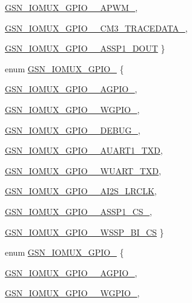 \begin{DoxyCompactItemize}
\par
\hyperlink{a00519_a2482cd55eb57e3f76b1ce4ac8b2c95c6ae1f534d3ea31f6bc476fa5f2a869f445}{GSN\_\-IOMUX\_\-GPIO\_\_\-APWM\_}, 
\par
\hyperlink{a00519_a2482cd55eb57e3f76b1ce4ac8b2c95c6a4d73c895de9cc795bd97d64a08ec021b}{GSN\_\-IOMUX\_\-GPIO\_\_\-CM3\_\-TRACEDATA\_}, 
\par
\hyperlink{a00519_a2482cd55eb57e3f76b1ce4ac8b2c95c6af34510a558c0e12fbd7bab49eeb75d74}{GSN\_\-IOMUX\_\-GPIO\_\_\-ASSP1\_\-DOUT}
 \}
\item 
enum \hyperlink{a00519_a4c309e7a91ab48d86106485591b85ba7}{GSN\_\-IOMUX\_\-GPIO\_} \{ \par
\hyperlink{a00519_a4c309e7a91ab48d86106485591b85ba7a68ab6b0225f599371050cb168b0a8a03}{GSN\_\-IOMUX\_\-GPIO\_\_\-AGPIO\_}, 
\par
\hyperlink{a00519_a4c309e7a91ab48d86106485591b85ba7aa8c694f7567e0ba95368815124a05d31}{GSN\_\-IOMUX\_\-GPIO\_\_\-WGPIO\_}, 
\par
\hyperlink{a00519_a4c309e7a91ab48d86106485591b85ba7af2ab06eec639d4e66ee8892e50b12b33}{GSN\_\-IOMUX\_\-GPIO\_\_\-DEBUG\_}, 
\par
\hyperlink{a00519_a4c309e7a91ab48d86106485591b85ba7afebd16534607204092b8e5e4a34fdcfe}{GSN\_\-IOMUX\_\-GPIO\_\_\-AUART1\_\-TXD}, 
\par
\hyperlink{a00519_a4c309e7a91ab48d86106485591b85ba7a1621194474335ecdcb442fe82b6ab4b9}{GSN\_\-IOMUX\_\-GPIO\_\_\-WUART\_\-TXD}, 
\par
\hyperlink{a00519_a4c309e7a91ab48d86106485591b85ba7aad39ab3a36a24622fd12c403ebd6f44a}{GSN\_\-IOMUX\_\-GPIO\_\_\-AI2S\_\-LRCLK}, 
\par
\hyperlink{a00519_a4c309e7a91ab48d86106485591b85ba7a61ad7530839da24c23e2cd2b02f114fa}{GSN\_\-IOMUX\_\-GPIO\_\_\-ASSP1\_\-CS\_}, 
\par
\hyperlink{a00519_a4c309e7a91ab48d86106485591b85ba7a33f60933a060f3ea1d303f5a3bd3518d}{GSN\_\-IOMUX\_\-GPIO\_\_\-WSSP\_\-BI\_\-CS}
 \}
\item 
enum \hyperlink{a00519_ad2c6d559f4b898b37fd1858edd2febb1}{GSN\_\-IOMUX\_\-GPIO\_} \{ \par
\hyperlink{a00519_ad2c6d559f4b898b37fd1858edd2febb1a1b22e98c50a4c7ac46421eae2b672bb7}{GSN\_\-IOMUX\_\-GPIO\_\_\-AGPIO\_}, 
\par
\hyperlink{a00519_ad2c6d559f4b898b37fd1858edd2febb1ac35a3c676b7618e04166863661bc8fde}{GSN\_\-IOMUX\_\-GPIO\_\_\-WGPIO\_}, 
\par

\end{DoxyCompactItemize}
